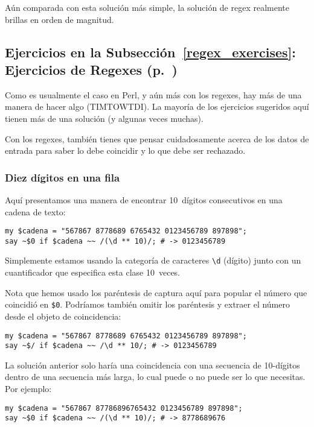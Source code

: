 Aún comparada con esta solución más simple, la solución de regex
realmente brillas en orden de magnitud.

\subsection{Ejercicios en la Subsección~\ref{regex_exercises}: Ejercicios de Regexes (p.~\pageref{regex_exercises})}
\label{sol_regex_exercises}

Como es usualmente el caso en Perl, y aún más con los regexes, 
hay más de una manera de hacer algo (TIMTOWTDI). La mayoría de los
ejercicios sugeridos aquí tienen más de una solución (y algunas
veces muchas).

Con los regexes, también tienes que pensar cuidadosamente acerca
de los datos de entrada para saber lo debe coincidir y lo
que debe ser rechazado.

\subsubsection{Diez dígitos en una fila}

Aquí presentamos una manera de encontrar 10~dígitos consecutivos
en una cadena de texto:

\begin{verbatim}
my $cadena = "567867 8778689 6765432 0123456789 897898";
say ~$0 if $cadena ~~ /(\d ** 10)/; # -> 0123456789
\end{verbatim}

Simplemente estamos usando la categoría de caracteres \verb|\d|
(dígito) junto con un cuantificador que especifica esta clase 10~veces.

Nota que hemos usado los paréntesis de captura aquí para popular
el número que coincidió en \verb|$0|. Podríamos también omitir los 
paréntesis y extraer el número desde el objeto de coincidencia:


\begin{verbatim}
my $cadena = "567867 8778689 6765432 0123456789 897898";
say ~$/ if $cadena ~~ /\d ** 10/; # -> 0123456789
\end{verbatim}
%

La solución anterior solo haría una coincidencia con una
secuencia de 10-dígitos dentro de una secuencia más larga, 
lo cual puede o no puede ser lo que necesitas. Por ejemplo:

\begin{verbatim}
my $cadena = "567867 87786896765432 0123456789 897898";
say ~$0 if $cadena ~~ /(\d ** 10)/; # -> 8778689676
\end{verbatim}

